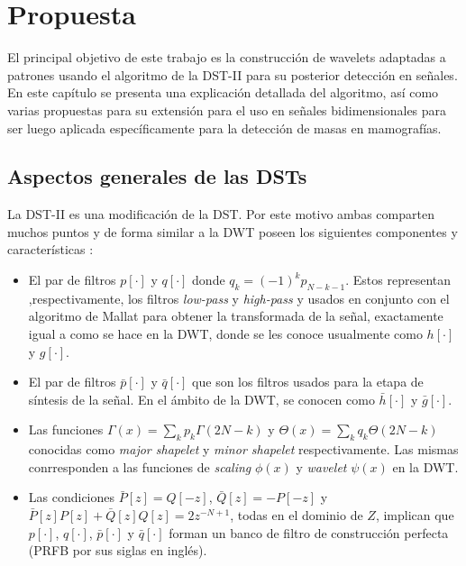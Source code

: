 \chapter{Propuesta}\label{chapter:proposal}

El principal objetivo de este trabajo es la construcción de wavelets adaptadas a patrones usando el algoritmo de
la DST-II \cite{Guido2018} para su posterior detección en señales. En este capítulo se presenta una explicación 
detallada del algoritmo, así como varias propuestas para su extensión para el uso en señales bidimensionales para
ser luego aplicada específicamente para la detección de masas en mamografías.

\section{Aspectos generales de las DSTs}

La DST-II es una modificación de la DST. Por este motivo ambas comparten muchos puntos y de forma similar 
a la DWT poseen los siguientes componentes y características \cite{Guido2008}\cite{Guido2018}:

\begin{itemize}
	\item El par de filtros $p[\cdot]$ y $q[\cdot]$ donde $q_k = (-1)^k p_{N-k-1}$. 
		Estos representan ,respectivamente, los filtros \textit{low-pass} y \textit{high-pass} y  
		usados en conjunto con el algoritmo de Mallat \cite{} para obtener la transformada de la 
		señal, exactamente igual a como se hace en la DWT, donde se les conoce usualmente como $h[\cdot]$ y
		$g[\cdot]$.
	\item El par de filtros $\bar p[\cdot]$  y $\bar q[\cdot]$ que son los filtros usados para la etapa 
		de síntesis de la señal. En el ámbito de la DWT, se conocen como $\bar h[\cdot]$ y $\bar g[\cdot]$.
	\item Las funciones $\Gamma(x)=\sum_k p_k \Gamma(2N-k)$ y $\Theta(x)=\sum_k q_k \Theta(2N-k)$ conocidas 
		como \textit{major shapelet} y \textit{minor shapelet} respectivamente. Las mismas conrresponden a las
		funciones de \textit{scaling} $\phi(x)$ y \textit{wavelet} $\psi(x)$ en la DWT.
	\item Las condiciones $\bar P[z] = Q[-z]$, $\bar Q[z]=-P[-z]$ y $\bar P[z]P[z] + \bar Q[z]Q[z]=2z^{-N+1}$,
		todas en el dominio de $Z$, implican que $p[\cdot]$, $q[\cdot]$, $\bar p[\cdot]$  y $\bar q[\cdot]$
		forman un banco de filtro de construcción perfecta (PRFB por sus siglas en inglés).
\end{itemize}

